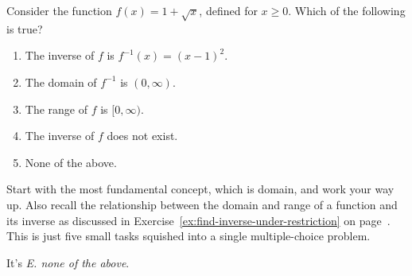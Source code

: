 \documentclass[../main.tex]{subfiles}
\begin{document}
\begin{exercise}
  Consider the function \(f(x) = 1 + \sqrt{x}\), defined for \(x \ge 0\). Which of the following is true?

  \begin{enumerate}[label=\Alph*.]
    \item The inverse of \(f\) is \(f^{-1}(x) = (x - 1)^{2}\).
    \item The domain of \(f^{-1}\) is \((0, \infty)\).
    \item The range of \(f\) is \([0, \infty)\).
    \item The inverse of \(f\) does not exist.
    \item None of the above.
  \end{enumerate}

  \begin{hint}
    Start with the most fundamental concept, which is domain, and work your way up. Also recall the relationship between the domain and range of a function and its inverse as discussed in Exercise~\ref{ex:find-inverse-under-restriction} on page~\pageref{ex:find-inverse-under-restriction}. This is just five small tasks squished into a single multiple-choice problem.
  \end{hint}
  \begin{solution}
    It's \emph{E. none of the above}.
  \end{solution}
\end{exercise}
\vfill
\clearpage
\end{document}

